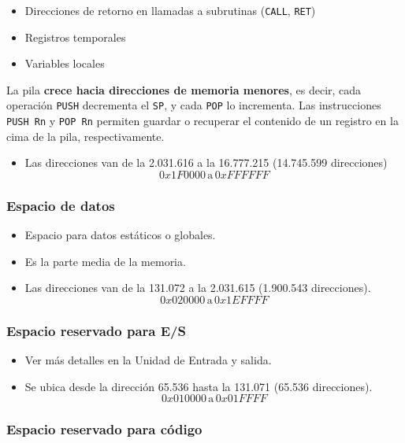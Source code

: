 \documentclass{article}
\begin{document}
\begin{itemize}
    \item Direcciones de retorno en llamadas a subrutinas (\texttt{CALL}, \texttt{RET})
    \item Registros temporales
    \item Variables locales
\end{itemize}

La pila \textbf{crece hacia direcciones de memoria menores}, es decir, cada operación \texttt{PUSH} decrementa el \texttt{SP}, y cada \texttt{POP} lo incrementa. Las instrucciones \texttt{PUSH Rn} y \texttt{POP Rn} permiten guardar o recuperar el contenido de un registro en la cima de la pila, respectivamente.

\begin{itemize}
    \item Las direcciones van de la 2.031.616 a la 16.777.215 (14.745.599 direcciones)
    \[
    0x1F0000 \, \text{a} \, 0xFFFFFF
    \]
\end{itemize}

\subsubsection{Espacio de datos}

\begin{itemize}
    \item Espacio para datos estáticos o globales.
    \item Es la parte media de la memoria.
    \item Las direcciones van de la 131.072 a la 2.031.615 (1.900.543 direcciones).
    \[
    0x020000 \, \text{a} \, 0x1EFFFF
    \]
\end{itemize}

\subsubsection{Espacio reservado para E/S}

\begin{itemize}
    \item Ver más detalles en la Unidad de Entrada y salida.
    \item Se ubica desde la dirección 65.536 hasta la 131.071 (65.536 direcciones).
    \[
    0x010000 \, \text{a} \, 0x01FFFF
    \]
\end{itemize}

\subsubsection{Espacio reservado para código}
\end{document}
